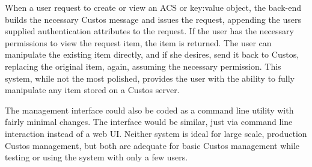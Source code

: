 When a user request to create or view an ACS or key:value object, the
back-end builds the necessary Custos message and issues the request,
appending the users supplied authentication attributes to the
request. If the user has the necessary permissions to view the request
item, the item is returned. The user can manipulate the existing item
directly, and if she desires, send it back to Custos, replacing the
original item, again, assuming the necessary permission. This system,
while not the most polished, provides the user with the ability to
fully manipulate any item stored on a Custos server.

The management interface could also be coded as a command line utility
with fairly minimal changes. The interface would be similar, just via
command line interaction instead of a web UI. Neither system is ideal
for large scale, production Custos management, but both are adequate
for basic Custos management while testing or using the system with
only a few users.

